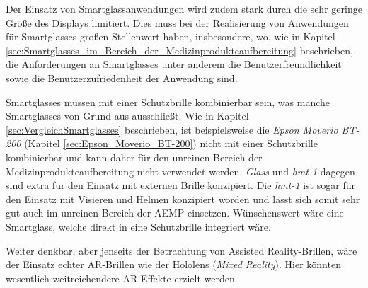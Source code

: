 Der Einsatz von Smartglassanwendungen wird zudem stark durch die sehr geringe Größe des Displays limitiert. Dies muss bei der Realisierung von Anwendungen für Smartglasses großen Stellenwert haben, insbesondere, wo, wie in Kapitel \ref{sec:Smartglasses_im_Bereich_der_Medizinprodukteaufbereitung} beschrieben, die Anforderungen an Smartglasses unter anderem die Benutzerfreundlichkeit sowie die Benutzerzufriedenheit der Anwendung sind.

Smartglasses müssen mit einer Schutzbrille kombinierbar sein, was manche Smartglasses von Grund aus ausschließt. Wie in Kapitel \ref{sec:VergleichSmartglasses} beschrieben, ist beispielsweise die \emph{Epson Moverio BT-200} (Kapitel \ref{sec:Epson_Moverio_BT-200}) nicht mit einer Schutzbrille kombinierbar und kann daher für den unreinen Bereich der Medizinprodukteaufbereitung nicht verwendet werden. \emph{Glass} und \emph{hmt-1} dagegen sind extra für den Einsatz mit externen Brille konzipiert. Die \emph{hmt-1} ist sogar für den Einsatz mit Visieren und Helmen konzipiert worden und lässt sich somit sehr gut auch im unreinen Bereich der AEMP einsetzen. Wünschenswert wäre eine Smartglass, welche direkt in eine Schutzbrille integriert wäre.

Weiter denkbar, aber jenseits der Betrachtung von Assisted Reality-Brillen, wäre der Einsatz echter AR-Brillen wie der Hololens (\emph{Mixed Reality}). Hier könnten wesentlich weitreichendere AR-Effekte erzielt werden. 
